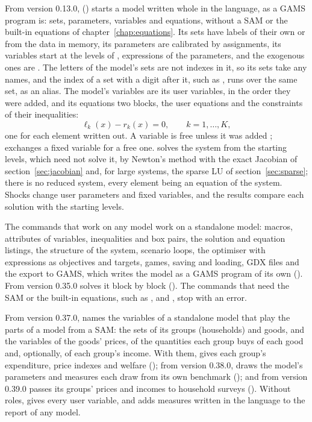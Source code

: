 From version 0.13.0,  () starts a model
written whole in the language, as a GAMS program is: sets, parameters,
variables and equations, without a SAM or the built-in equations of
chapter~\ref{chap:equations}. Its sets have labels of their own or from the
data in memory, its parameters are calibrated by assignments, its variables
start at the levels of , expressions of the parameters, and
the exogenous ones are . The letters of the model's sets are not
indexes in it, so its sets take any names, and the index of a set with a
digit after it, such as , runs over the same set, as an alias. The
model's variables are its user variables, in the order they were added, and
its equations two blocks, the user equations and the constraints of their
inequalities:
\begin{equation*}
\ell_k(x) - r_k(x) = 0, \qquad k = 1, \dots, K,
\end{equation*}
one for each element written out. A variable is free unless it was added
;  exchanges a fixed variable for a free
one.  solves the system from the starting levels, which need
not solve it, by Newton's method with the exact Jacobian of
section~\ref{sec:jacobian} and, for large systems, the sparse LU of
section~\ref{sec:sparse}; there is no reduced system, every element being an
equation of the system. Shocks change user parameters and fixed variables,
and the results compare each solution with the starting levels.

The commands that work on any model work on a standalone model: macros,
attributes of variables, inequalities and box pairs, the solution and
equation listings, the structure of the system, scenario loops, the
optimiser with expressions as objectives and targets, games, saving and
loading, GDX files and the export to GAMS, which writes the model as a GAMS
program of its own (). From version 0.35.0
 solves it block by block ().
The commands that need the SAM or the built-in equations, such as
,  and , stop with
an error.

From version 0.37.0,  names the variables of a
standalone model that play the parts of a model from a SAM: the sets of its
groups (households) and goods, and the variables of the goods' prices, of the
quantities each group buys of each good and, optionally, of each group's
income. With them,  gives each group's expenditure, price
indexes and welfare (); from version 0.38.0,
 draws the model's parameters and measures each draw
from its own benchmark (); and from version 0.39.0
 passes its groups' prices and incomes to household
surveys (). Without roles,  gives
every user variable, and  adds measures written in the
language to the report of any model.

